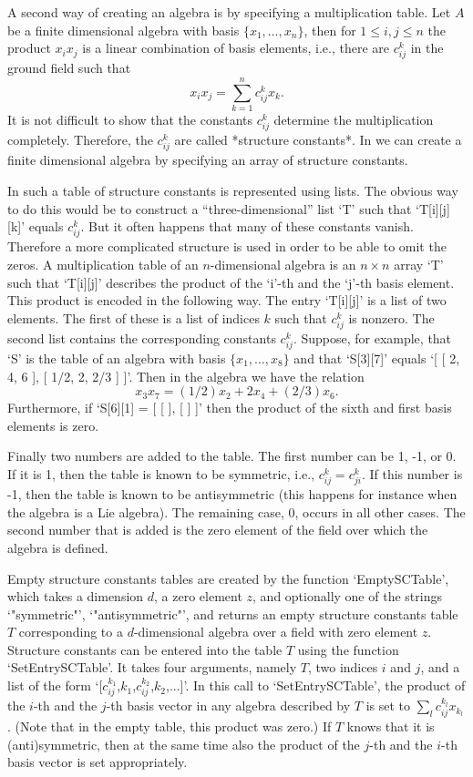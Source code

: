 A second way of creating an algebra is by specifying a multiplication 
table. Let $A$ be a finite dimensional algebra with basis 
$\{x_1,\ldots,x_n\}$, then for $1\leq i,j\leq n$ the product $x_ix_j$ is
a linear combination of basis elements, i.e., there are $c_{ij}^k$ in the
ground field such that
$$x_ix_j=\sum_{k=1}^n c_{ij}^k x_k.$$
It is not difficult to show that the constants $c_{ij}^k$
determine the multiplication completely. Therefore, the $c_{ij}^k$ are
called *structure constants*. In {\GAP} we can create a finite dimensional
algebra by specifying an array of structure constants.

In {\GAP} such a table of structure constants is represented using 
lists. The obvious way to do this
would be to construct a ``three-dimensional'' list `T' such that  
`T[i][j][k]' equals
$c_{ij}^k$. But it often happens that many of these constants vanish.
Therefore a more complicated structure is used in order to be able to 
omit
the zeros. A multiplication table of an $n$-dimensional algebra is an 
$n\times n$ array `T' such that `T[i][j]' describes the product
of the `i'-th and the `j'-th basis element. This product is encoded
in the following way. The entry `T[i][j]' is a list of two elements. 
The first of these is a list of
indices $k$ such that $c_{ij}^k$ is nonzero. The second list contains the
corresponding constants $c_{ij}^k$. Suppose, for example,  that `S' 
is the table 
of an algebra with basis $\{x_1,\ldots ,x_8\}$ and that `S[3][7]' 
equals `[ [ 2, 4, 6 ], [ 1/2, 2, 2/3 ] ]'. Then in the algebra we 
have the relation 
$$x_3 x_7=(1/2) x_2 + 2 x_4 + (2/3) x_6.$$
Furthermore, if `S[6][1] = [ [  ], [  ] ]' then the product of the
sixth and first basis elements is zero.

Finally two numbers are added to the table. The first number can be
1, -1, or 0. If it is 1, then the table is known to be symmetric,
i.e., $c_{ij}^k=c_{ji}^k$. If this number is -1, then the table is
known to be antisymmetric (this happens for instance when the algebra
is a Lie algebra).
The remaining case, 0, occurs in all other cases. 
The second number that is added is the zero element of the field over 
which the algebra is defined.  

Empty structure constants tables are created by the function
`EmptySCTable', which takes a dimension $d$, a zero element $z$,
and optionally one of the strings `"symmetric"', `"antisymmetric"',
and returns an empty structure constants table $T$ corresponding to
a $d$-dimensional algebra over a field with zero element $z$.
Structure constants can be entered into the table $T$ using the function
`SetEntrySCTable'.
It takes four arguments, namely $T$, two indices $i$ and $j$,
and a list of the form `[$c_{ij}^{k_1}$,$k_1$,$c_{ij}^{k_2}$,$k_2$,...]'.
In this call to `SetEntrySCTable',
the product of the $i$-th and the $j$-th basis vector
in any algebra described by $T$ is set to $\sum_l c_{ij}^{k_l} x_{k_l}$.
(Note that in the empty table, this product was zero.)
If $T$ knows that it is (anti)symmetric, then at the same time also
the product of the $j$-th and the $i$-th basis vector is set appropriately.

